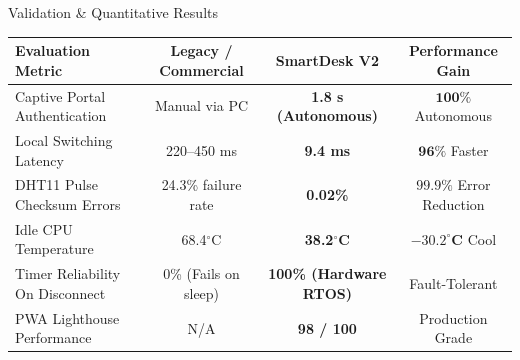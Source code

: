 \documentclass[aspectratio=169, 10pt]{beamer}
\begin{document}
\begin{frame}{Validation \& Quantitative Results}
    \begin{table}
        \centering
        \small
        \begin{tabular}{@{}lccc@{}}
            \toprule
            \textbf{Evaluation Metric} & \textbf{Legacy / Commercial} & \textbf{SmartDesk V2} & \textbf{Performance Gain} \\
            \midrule
            Captive Portal Authentication & Manual via PC & \textbf{1.8 s (Autonomous)} & $\mathbf{100\%}$ Autonomous \\
            Local Switching Latency & 220--450 ms & \textbf{9.4 ms} & $\mathbf{96\%}$ Faster \\
            DHT11 Pulse Checksum Errors & 24.3\% failure rate & \textbf{0.02\%} & $\mathbf{99.9\%}$ Error Reduction \\
            Idle CPU Temperature & 68.4$^\circ$C & \textbf{38.2$^\circ$C} & $\mathbf{-30.2^\circ C}$ Cool \\
            Timer Reliability On Disconnect & 0\% (Fails on sleep) & \textbf{100\% (Hardware RTOS)} & Fault-Tolerant \\
            PWA Lighthouse Performance & N/A & \textbf{98 / 100} & Production Grade \\
            \bottomrule
        \end{tabular}
    \end{table}
\end{frame}
\end{document}
